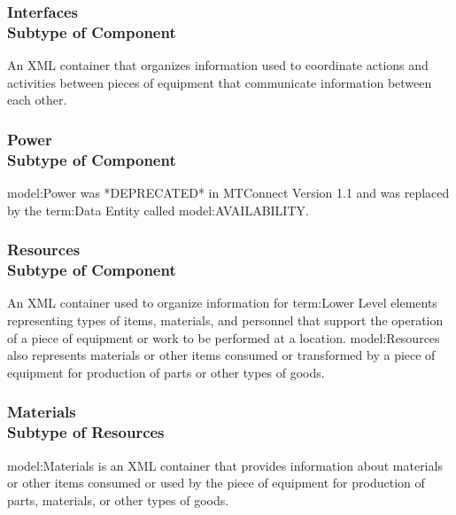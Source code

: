 \FloatBarrier
\subsubsection[Interfaces]{Interfaces \\ {\small Subtype of Component}}
  \label{type:Interfaces}

\FloatBarrier

An XML container that organizes information used to coordinate actions and activities between pieces of equipment that communicate information between each other.

\FloatBarrier
\subsubsection[Power]{Power \\ {\small Subtype of Component}}
  \label{type:Power}

\FloatBarrier

{model:Power} was *DEPRECATED* in MTConnect Version 1.1 and was replaced by the {term:Data Entity} called {model:AVAILABILITY}.

\FloatBarrier
\subsubsection[Resources]{Resources \\ {\small Subtype of Component}}
  \label{type:Resources}

\FloatBarrier

An XML container used to organize information for {term:Lower Level} elements representing types of items, materials, and personnel that support the operation of a piece of equipment or work to be performed at a location. {model:Resources} also represents materials or other items consumed or transformed by a piece of equipment for production of parts or other types of goods.

\FloatBarrier
\subsubsection[Materials]{Materials \\ {\small Subtype of Resources}}
  \label{type:Materials}

\FloatBarrier

{model:Materials} is an XML container that provides information about materials or other items consumed or used by the piece of equipment for production of parts, materials, or other types of goods.

